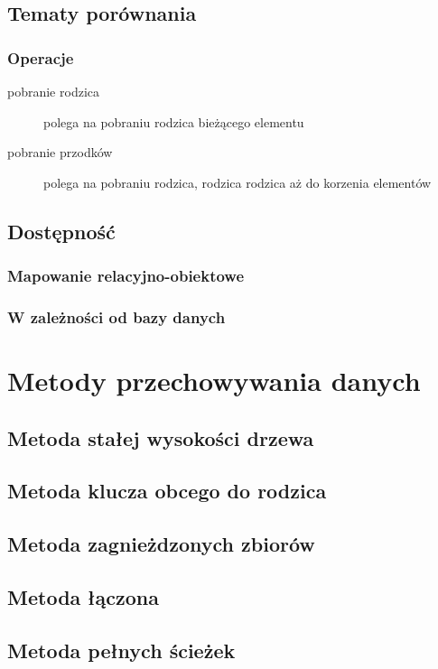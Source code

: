 \documentclass[10pt,a4paper,oneside]{book}
\begin{document}
\section{Tematy porównania}
\subsection{Operacje}
\begin{description}
	\item[pobranie rodzica] polega na pobraniu rodzica bieżącego elementu
	\item[pobranie przodków] polega na pobraniu rodzica, rodzica rodzica aż do korzenia elementów
\end{description}

\section{Dostępność}
\subsection{Mapowanie relacyjno-obiektowe}
\subsection{W zależności od bazy danych}

\chapter{Metody przechowywania danych}

\section{Metoda stałej wysokości drzewa}

\section{Metoda klucza obcego do rodzica}

\section{Metoda zagnieżdzonych zbiorów}

\section{Metoda łączona}

\section{Metoda pełnych ścieżek}
\end{document}
